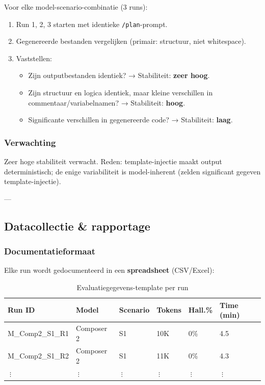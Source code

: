 Voor elke model-scenario-combinatie (3 runs):
\begin{enumerate}
  \item Run 1, 2, 3 starten met identieke \texttt{/plan}-prompt.
  \item Gegenereerde bestanden vergelijken (primair: structuur, niet whitespace).
  \item Vaststellen:
    \begin{itemize}
      \item Zijn outputbestanden identiek? → Stabiliteit: \textbf{zeer hoog}.
      \item Zijn structuur en logica identiek, maar kleine verschillen in commentaar/variabelnamen? → Stabiliteit: \textbf{hoog}.
      \item Significante verschillen in gegenereerde code? → Stabiliteit: \textbf{laag}.
    \end{itemize}
\end{enumerate}

\subsubsection{Verwachting}

Zeer hoge stabiliteit verwacht. Reden: template-injectie maakt output deterministisch; de enige variabiliteit is model-inherent (zelden significant gegeven template-injectie).

---

\subsection{Datacollectie \& rapportage}

\subsubsection{Documentatieformaat}

Elke run wordt gedocumenteerd in een \textbf{spreadsheet} (CSV/Excel):

\begin{table}[htbp]
  \centering
  \caption{Evaluatiegegevens-template per run}
  \label{tab:eval-data-template}
  \small
  \begin{tabularx}{\textwidth}{|l|l|l|l|l|l|}
    \hline
    \textbf{Run ID} & \textbf{Model} & \textbf{Scenario} & \textbf{Tokens} & \textbf{Hall.\%} & \textbf{Time (min)} \\
    \hline
    M\_Comp2\_S1\_R1 & Composer 2 & S1 & 10K & 0\% & 4.5 \\
    \hline
    M\_Comp2\_S1\_R2 & Composer 2 & S1 & 11K & 0\% & 4.3 \\
    \hline
    \(⋮\) & \(⋮\) & \(⋮\) & \(⋮\) & \(⋮\) & \(⋮\) \\
    \hline
  \end{tabularx}
\end{table}

